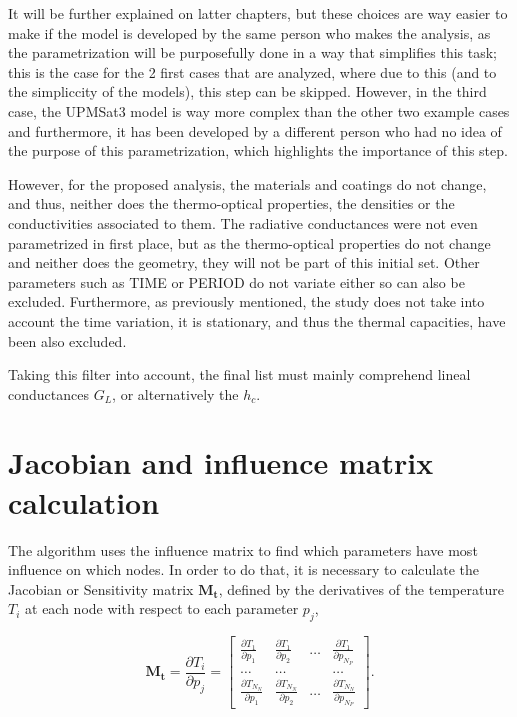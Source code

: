 It will be further explained on latter chapters, but these choices are way easier to make if the model is developed by the same person who makes the analysis, as the parametrization will be purposefully done in a way that simplifies this task; this is the case for the 2 first cases that are analyzed, where due to this (and to the simpliccity of the models), this step can be skipped. However, in the third case, the UPMSat3 model is way more complex than the other two example cases and furthermore,  it has been developed by a different person who had no idea of the purpose of this parametrization, which highlights the importance of this step.

However, for the proposed analysis, the materials and coatings do not change, and thus, neither does the thermo-optical properties, the densities or the conductivities associated to them. The radiative conductances were not even parametrized in first place, but as the thermo-optical properties do not  change and neither does the geometry, they will not be part of this initial set. Other parameters such as TIME or PERIOD do not variate either so can also be excluded. Furthermore, as previously mentioned, the study does not take into account the time variation, it is stationary, and thus the thermal capacities, have been also excluded.

Taking this filter into account, the final list must mainly comprehend lineal conductances $G_L$, or alternatively the $h_c$.


\section{Jacobian and influence matrix calculation}
The algorithm uses the influence matrix to find which parameters have most influence on which nodes. In order to do that, it is necessary to calculate the Jacobian or Sensitivity matrix $\boldsymbol{M_t}$, defined by the derivatives of the temperature $T_i$ at each node with respect to each parameter $p_j$, 

\begin{equation}
    \boldsymbol{M_t} = \frac{\partial T_i}{\partial p_j} =\left[\begin{array}{cccc}
\frac{\partial T_1}{\partial p_1}  & \frac{\partial T_1}{\partial p_2}  & \ldots & \frac{\partial T_1}{\partial p_{N_P}}  \\
\ldots & \ldots & & \ldots \\
\frac{\partial T_{N_N}}{\partial p_1}  & \frac{\partial T_{N_N}}{\partial p_2}  & \ldots & \frac{\partial T_{N_N}}{\partial p_{N_P}} 
\end{array}\right].
\end{equation}

